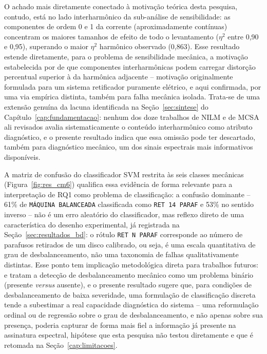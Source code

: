 \documentclass[times,final]{elsarticle}
\begin{document}
O achado mais diretamente conectado à motivação teórica desta pesquisa, contudo, está no lado interharmônico da sub-análise de sensibilidade: as componentes de ordem 0 e 1 da corrente (aproximadamente contínuas) concentram os maiores tamanhos de efeito de todo o levantamento ($\eta^2$ entre 0,90 e 0,95), superando o maior $\eta^2$ harmônico observado (0,863). Esse resultado estende diretamente, para o problema de sensibilidade mecânica, a motivação estabelecida por \citet{efe2016} de que componentes interharmônicas podem carregar distorção percentual superior à da harmônica adjacente -- motivação originalmente formulada para um sistema retificador puramente elétrico, e aqui confirmada, por uma via empírica distinta, também para falha mecânica isolada. Trata-se de uma extensão genuína da lacuna identificada na Seção~\ref{sec:sintese} do Capítulo~\ref{cap:fundamentacao}: nenhum dos doze trabalhos de NILM e de MCSA ali revisados avalia sistematicamente o conteúdo interharmônico como atributo diagnóstico, e o presente resultado indica que essa omissão pode ter descartado, também para diagnóstico mecânico, um dos sinais espectrais mais informativos disponíveis.

A matriz de confusão do classificador SVM restrita às seis classes mecânicas (Figura~\ref{fig:res_cm6}) qualifica essa evidência de forma relevante para a interpretação de RQ1 como problema de classificação: a confusão dominante -- 61\% de \texttt{MÁQUINA BALANCEADA} classificada como \texttt{RET~14~PARAF} e 53\% no sentido inverso -- não é um erro aleatório do classificador, mas reflexo direto de uma característica do desenho experimental, já registrada na Seção~\ref{sec:resultados_bd}: o rótulo \texttt{RET~N~PARAF} corresponde ao número de parafusos retirados de um disco calibrado, ou seja, é uma escala quantitativa de grau de desbalanceamento, não uma taxonomia de falhas qualitativamente distintas. Esse ponto tem implicação metodológica direta para trabalhos futuros: \citet{martinez2022} e \citet{benamira2022} tratam a detecção de desbalanceamento mecânico como um problema binário (presente \textit{versus} ausente), e o presente resultado sugere que, para condições de desbalanceamento de baixa severidade, uma formulação de classificação discreta tende a subestimar a real capacidade diagnóstica do sistema -- uma reformulação ordinal ou de regressão sobre o grau de desbalanceamento, e não apenas sobre sua presença, poderia capturar de forma mais fiel a informação já presente na assinatura espectral, hipótese que esta pesquisa não testou diretamente e que é retomada na Seção~\ref{cap:limitacoes}.
\end{document}
